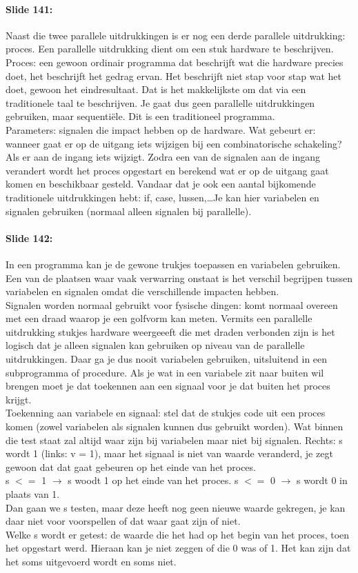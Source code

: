 \documentclass[10pt,a4paper]{book}
\begin{document}
\paragraph{Slide 141:} Naast die twee parallele uitdrukkingen is er nog een derde parallele uitdrukking: proces. Een parallelle uitdrukking dient om een stuk hardware te beschrijven. Proces: een gewoon ordinair programma dat beschrijft wat die hardware precies doet, het beschrijft het gedrag ervan. Het beschrijft niet stap voor stap wat het doet, gewoon het eindresultaat. Dat is het makkelijkste om dat via een traditionele taal te beschrijven. Je gaat dus geen parallelle uitdrukkingen gebruiken, maar sequenti\"ele. Dit is een traditioneel programma.\\
Parameters: signalen die impact hebben op de hardware. Wat gebeurt er: wanneer gaat er op de uitgang iets wijzigen bij een combinatorische schakeling? Als er aan de ingang iets wijzigt. Zodra een van de signalen aan de ingang verandert wordt het proces opgestart en berekend wat er op de uitgang gaat komen en beschikbaar gesteld. Vandaar dat je ook een aantal bijkomende traditionele uitdrukkingen hebt: if, case, lussen,\ldots Je kan hier variabelen en signalen gebruiken (normaal alleen signalen bij parallelle).

\paragraph{Slide 142:} In een programma kan je de gewone trukjes toepassen en variabelen gebruiken. Een van de plaatsen waar vaak verwarring onstaat is het verschil begrijpen tussen variabelen en signalen omdat die verschillende impacten hebben.\\
Signalen worden normaal gebruikt voor fysische dingen: komt normaal overeen met een draad waarop je een golfvorm kan meten. Vermits een parallelle uitdrukking stukjes hardware weergeeeft die met draden verbonden zijn is het logisch dat je alleen signalen kan gebruiken op niveau van de parallelle uitdrukkingen. Daar ga je dus nooit variabelen gebruiken, uitsluitend in een subprogramma of procedure. Als je wat in een variabele zit naar buiten wil brengen moet je dat toekennen aan een signaal voor je dat buiten het proces krijgt.\\
Toekenning aan variabele en signaal: stel dat de stukjes code uit een proces komen (zowel variabelen als signalen kunnen dus gebruikt worden). Wat binnen die test staat zal altijd waar zijn bij variabelen maar niet bij signalen. Rechts: s wordt 1 (links: v = 1), maar het signaal is niet van waarde veranderd, je zegt gewoon dat dat gaat gebeuren op het einde van het proces.\\
s $<=$ 1 $\rightarrow$ s woodt 1 op het einde van het proces. s $<=$ 0 $\rightarrow$ s wordt 0 in plaats van 1.\\
Dan gaan we s testen, maar deze heeft nog geen nieuwe waarde gekregen, je kan daar niet voor voorspellen of dat waar gaat zijn of niet.\\
Welke s wordt er getest: de waarde die het had op het begin van het proces, toen het opgestart werd. Hieraan kan je niet zeggen of die 0 was of 1. Het kan zijn dat het soms uitgevoerd wordt en soms niet.
\end{document}
